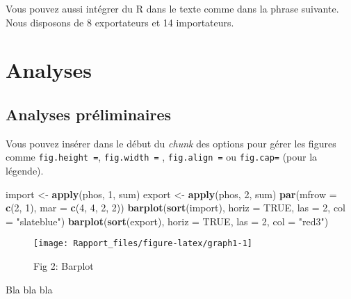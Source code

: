 \documentclass[
]{article}
\newenvironment{Shaded}{\begin{snugshade}}{\end{snugshade}}
\newcommand{\AttributeTok}[1]{\textcolor[rgb]{0.13,0.29,0.53}{#1}}
\newcommand{\ConstantTok}[1]{\textcolor[rgb]{0.56,0.35,0.01}{#1}}
\newcommand{\DecValTok}[1]{\textcolor[rgb]{0.00,0.00,0.81}{#1}}
\newcommand{\FunctionTok}[1]{\textcolor[rgb]{0.13,0.29,0.53}{\textbf{#1}}}
\newcommand{\NormalTok}[1]{#1}
\newcommand{\OtherTok}[1]{\textcolor[rgb]{0.56,0.35,0.01}{#1}}
\newcommand{\StringTok}[1]{\textcolor[rgb]{0.31,0.60,0.02}{#1}}
\begin{document}
Vous pouvez aussi intégrer du R dans le texte comme dans la phrase
suivante. Nous disposons de 8 exportateurs et 14 importateurs.

\section{Analyses}\label{analyses}

\subsection{Analyses préliminaires}\label{analyses-pruxe9liminaires}

Vous pouvez insérer dans le début du \emph{chunk} des options pour gérer
les figures comme \texttt{fig.height\ =}, \texttt{fig.width\ =} ,
\texttt{fig.align\ =} ou \texttt{fig.cap=} (pour la légende).

\begin{Shaded}
\begin{Highlighting}[]
\NormalTok{import }\OtherTok{\textless{}{-}} \FunctionTok{apply}\NormalTok{(phos, }\DecValTok{1}\NormalTok{, sum)}
\NormalTok{export }\OtherTok{\textless{}{-}} \FunctionTok{apply}\NormalTok{(phos, }\DecValTok{2}\NormalTok{, sum)}
\FunctionTok{par}\NormalTok{(}\AttributeTok{mfrow =} \FunctionTok{c}\NormalTok{(}\DecValTok{2}\NormalTok{, }\DecValTok{1}\NormalTok{), }\AttributeTok{mar =} \FunctionTok{c}\NormalTok{(}\DecValTok{4}\NormalTok{, }\DecValTok{4}\NormalTok{, }\DecValTok{2}\NormalTok{, }\DecValTok{2}\NormalTok{))}
\FunctionTok{barplot}\NormalTok{(}\FunctionTok{sort}\NormalTok{(import),}
  \AttributeTok{horiz =} \ConstantTok{TRUE}\NormalTok{,}
  \AttributeTok{las =} \DecValTok{2}\NormalTok{,}
  \AttributeTok{col =} \StringTok{"slateblue"}\NormalTok{)}
\FunctionTok{barplot}\NormalTok{(}\FunctionTok{sort}\NormalTok{(export),}
        \AttributeTok{horiz =} \ConstantTok{TRUE}\NormalTok{,}
        \AttributeTok{las =} \DecValTok{2}\NormalTok{,}
        \AttributeTok{col =} \StringTok{"red3"}\NormalTok{)}
\end{Highlighting}
\end{Shaded}

\begin{figure}

{\centering \texttt{[image: Rapport\_files/figure-latex/graph1-1]} 

}

\caption{Fig 2: Barplot}\label{fig:graph1}
\end{figure}

Bla bla bla
\end{document}
